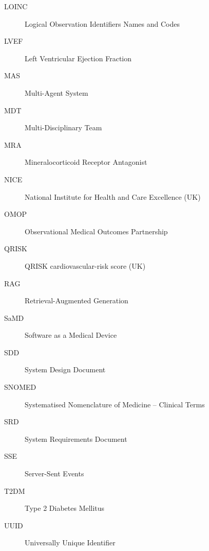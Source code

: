 \begin{description}
  \item[LOINC]    Logical Observation Identifiers Names and Codes
  \item[LVEF]     Left Ventricular Ejection Fraction
  \item[MAS]      Multi-Agent System
  \item[MDT]      Multi-Disciplinary Team
  \item[MRA]      Mineralocorticoid Receptor Antagonist
  \item[NICE]     National Institute for Health and Care Excellence (UK)
  \item[OMOP]     Observational Medical Outcomes Partnership
  \item[QRISK]    QRISK cardiovascular-risk score (UK)
  \item[RAG]      Retrieval-Augmented Generation
  \item[SaMD]     Software as a Medical Device
  \item[SDD]      System Design Document
  \item[SNOMED]   Systematised Nomenclature of Medicine -- Clinical Terms
  \item[SRD]      System Requirements Document
  \item[SSE]      Server-Sent Events
  \item[T2DM]     Type 2 Diabetes Mellitus
  \item[UUID]     Universally Unique Identifier

\end{description}
